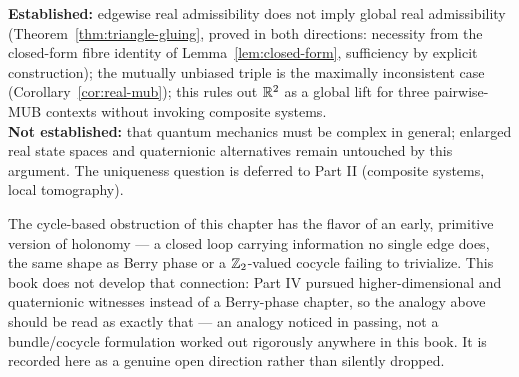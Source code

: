 \begin{ledgerentry}
\textbf{Established:} edgewise real admissibility does not imply global real
admissibility (Theorem~\ref{thm:triangle-gluing}, proved in both directions:
necessity from the closed-form fibre identity of
Lemma~\ref{lem:closed-form}, sufficiency by explicit construction); the
mutually unbiased triple is the maximally inconsistent case
(Corollary~\ref{cor:real-mub}); this rules out $\mathbb{R}^2$ as a global lift for
three pairwise-MUB contexts without invoking composite systems.\\
\textbf{Not established:} that quantum mechanics must be complex in general;
enlarged real state spaces and quaternionic alternatives remain untouched by this
argument. The uniqueness question is deferred to Part II (composite systems,
local tomography).
\end{ledgerentry}

\begin{remark}
The cycle-based obstruction of this chapter has the flavor of an early,
primitive version of holonomy — a closed loop carrying information no
single edge does, the same shape as Berry phase or a $\mathbb{Z}_2$-valued
cocycle failing to trivialize. This book does not develop that connection:
Part IV pursued higher-dimensional and quaternionic witnesses instead of a
Berry-phase chapter, so the analogy above should be read as exactly that
— an analogy noticed in passing, not a bundle/cocycle formulation worked
out rigorously anywhere in this book. It is recorded here as a genuine
open direction rather than silently dropped.
\end{remark}
